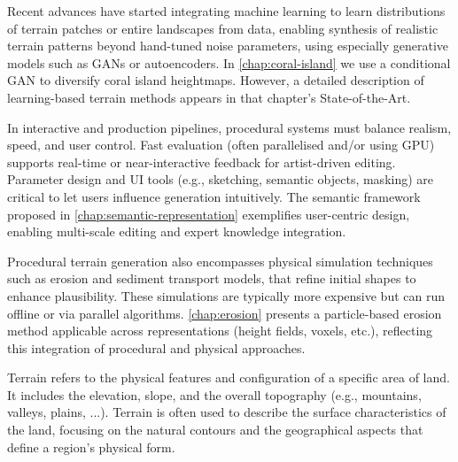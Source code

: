 Recent advances have started integrating machine learning to learn distributions of terrain patches or entire landscapes from data, enabling synthesis of realistic terrain patterns beyond hand-tuned noise parameters, using especially generative models such as GANs or autoencoders. In \cref{chap:coral-island} we use a conditional GAN to diversify coral island heightmaps. However, a detailed description of learning-based terrain methods appears in that chapter's State-of-the-Art.

In interactive and production pipelines, procedural systems must balance realism, speed, and user control. Fast evaluation (often parallelised and/or using GPU) supports real-time or near-interactive feedback for artist-driven editing. Parameter design and UI tools (e.g., sketching, semantic objects, masking) are critical to let users influence generation intuitively. The semantic  framework proposed in \cref{chap:semantic-representation} exemplifies user-centric design, enabling multi-scale editing and expert knowledge integration.

Procedural terrain generation also encompasses physical simulation techniques such as erosion and sediment transport models, that refine initial shapes to enhance plausibility. These simulations are typically more expensive but can run offline or via parallel algorithms. \cref{chap:erosion} presents a particle-based erosion method applicable across representations (height fields, voxels, etc.), reflecting this integration of procedural and physical approaches.


Terrain refers to the physical features and configuration of a specific area of land. It includes the elevation, slope, and the overall topography (e.g., mountains, valleys, plains, ...). Terrain is often used to describe the surface characteristics of the land, focusing on the natural contours and the geographical aspects that define a region's physical form.


